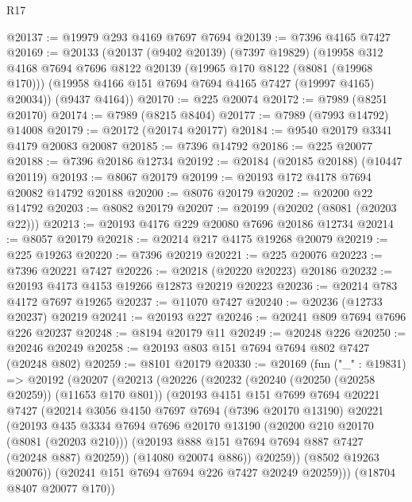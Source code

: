 \begin{lexlean}{R17}
\begin{coremodule}
@20137 := @19979 @293 @4169 @7697 @7694
@20139 := @7396 @4165 @7427
@20169 := @20133
    (@20137
      (@9402 @20139)
      (@7397 @19829)
      (@19958
        @312
        @4168
        @7694
        @7696
        @8122
        @20139
        (@19965 @170 @8122 (@8081 (@19968 @170)))
        (@19958 @4166 @151 @7694 @7694 @4165 @7427 (@19997 @4165) @20034))
      (@9437 @4164))
@20170 := @225 @20074
@20172 := @7989 (@8251 @20170)
@20174 := @7989 (@8215 @8404)
@20177 := @7989 (@7993 @14792) @14008
@20179 := @20172 (@20174 @20177)
@20184 := @9540 @20179 @3341 @4179 @20083 @20087
@20185 := @7396 @14792
@20186 := @225 @20077
@20188 := @7396 @20186 @12734
@20192 := @20184 (@20185 @20188) (@10447 @20119)
@20193 := @8067 @20179
@20199 := @20193 @172 @4178 @7694 @20082 @14792 @20188
@20200 := @8076 @20179
@20202 := @20200 @22 @14792
@20203 := @8082 @20179
@20207 := @20199 (@20202 (@8081 (@20203 @22)))
@20213 := @20193 @4176 @229 @20080 @7696 @20186 @12734
@20214 := @8057 @20179
@20218 := @20214 @217 @4175 @19268 @20079
@20219 := @225 @19263
@20220 := @7396 @20219
@20221 := @225 @20076
@20223 := @7396 @20221 @7427
@20226 := @20218 (@20220 @20223) @20186
@20232 := @20193 @4173 @4153 @19266 @12873 @20219 @20223
@20236 := @20214 @783 @4172 @7697 @19265
@20237 := @11070 @7427
@20240 := @20236 (@12733 @20237) @20219
@20241 := @20193 @227
@20246 := @20241 @809 @7694 @7696 @226 @20237
@20248 := @8194 @20179 @11
@20249 := @20248 @226
@20250 := @20246 @20249
@20258 := @20193 @803 @151 @7694 @7694 @802 @7427 (@20248 @802)
@20259 := @8101 @20179
@20330 := @20169
    (fun ("_" : @19831) =>
    @20192
      (@20207
        (@20213
          (@20226
            (@20232
              (@20240 (@20250 (@20258 @20259)) (@11653 @170 @801))
              (@20193
                @4151
                @151
                @7699
                @7694
                @20221
                @7427
                (@20214
                  @3056
                  @4150
                  @7697
                  @7694
                  (@7396 @20170 @13190)
                  @20221
                  (@20193
                    @435
                    @3334
                    @7694
                    @7696
                    @20170
                    @13190
                    (@20200 @210 @20170 (@8081 (@20203 @210)))
                    (@20193 @888 @151 @7694 @7694 @887 @7427 (@20248 @887) @20259))
                  (@14080 @20074 @886))
                @20259))
            (@8502 @19263 @20076))
          (@20241 @151 @7694 @7694 @226 @7427 @20249 @20259)))
      (@18704 @8407 @20077 @170))

\end{coremodule}
\end{lexlean}
